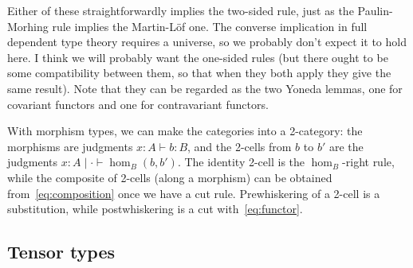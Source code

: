 \documentclass{amsart}
\let\types\vdash %
\def\cb{\mid} %
\def\mor#1{\hom_{#1}}
\def\ec{\cdot} %
\begin{document}
Either of these straightforwardly implies the two-sided rule, just as the Paulin-Morhing rule implies the Martin-L\"of one.
The converse implication in full dependent type theory requires a universe, so we probably don't expect it to hold here.
I think we will probably want the one-sided rules (but there ought to be some compatibility between them, so that when they both apply they give the same result).
Note that they can be regarded as the two Yoneda lemmas, one for covariant functors and one for contravariant functors.

With morphism types, we can make the categories into a 2-category: the morphisms are judgments $x:A \types b:B$, and the 2-cells from $b$ to $b'$ are the judgments $x:A \cb \ec \types \mor B(b,b')$.
The identity 2-cell is the $\mor B$-right rule, while the composite of 2-cells (along a morphism) can be obtained from~\eqref{eq:composition} once we have a cut rule.
Prewhiskering of a 2-cell is a substitution, while postwhiskering is a cut with~\eqref{eq:functor}.

\subsection{Tensor types}
\label{sec:tensor-types}
\end{document}

